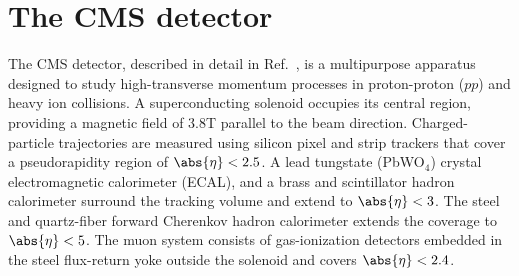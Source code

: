 %
%
%

\section{The CMS detector}

The CMS detector, described in detail in Ref.~\cite{CMSdetector}, is a multipurpose apparatus designed to study high-transverse momentum  processes in proton-proton ($pp$) and heavy ion collisions.
%                                                                                                                                                                                                    
A superconducting solenoid occupies its central region, providing a magnetic field of 3.8\unit{T} parallel to the beam direction.
%                                                                                                                                                                                                    
Charged-particle trajectories are measured using silicon pixel and strip trackers that cover a pseudorapidity region of $\abs{\eta} < 2.5$.
%                                                                                                                                                                                                    
A lead tungstate (PbWO$_4$) crystal electromagnetic calorimeter (ECAL), and a brass and scintillator hadron calorimeter  surround the tracking volume and extend to $\abs{\eta} < 3$.
%                                                                                                                                                                                                    
The steel and quartz-fiber forward Cherenkov hadron calorimeter extends the coverage to $\abs{\eta} < 5$.
%                                                                                                                                                                                                    
The muon system consists of gas-ionization detectors embedded in the steel flux-return yoke outside the solenoid and covers $\abs{\eta} < 2.4$.
